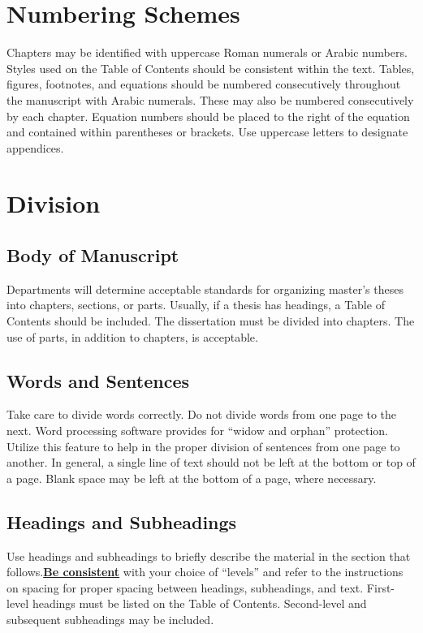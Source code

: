 \section{Numbering Schemes}
Chapters may be identified with uppercase Roman numerals or Arabic numbers. Styles used on the Table of Contents should be consistent within the text. Tables, figures, footnotes, and equations should be numbered consecutively throughout the manuscript with Arabic numerals. These may also be numbered consecutively by each chapter. Equation numbers should be placed to the right of the equation and contained within parentheses or brackets. Use uppercase letters to designate appendices.



\section{Division}

\subsection{Body of Manuscript}
Departments will determine acceptable standards for organizing master’s theses into chapters, sections, or parts. Usually, if a thesis has headings, a Table of Contents should be included. The dissertation must be divided into chapters. The use of parts, in addition to chapters, is acceptable. 

\subsection{Words and Sentences}
Take care to divide words correctly. Do not divide words from one page to the next. Word processing software provides for “widow and orphan” protection. Utilize this feature to help in the proper division of sentences from one page to another. In general, a single line of text should not be left at the bottom or top of a page. Blank space may be left at the bottom of a page, where necessary.

\subsection{Headings and Subheadings}
Use headings and subheadings to briefly describe the material in the section that follows.\underline{\textbf{Be consistent}} with your choice of “levels” and refer to the instructions on spacing for proper spacing between headings, subheadings, and text. First-level headings must be listed on the Table of Contents. Second-level and subsequent subheadings may be included.




